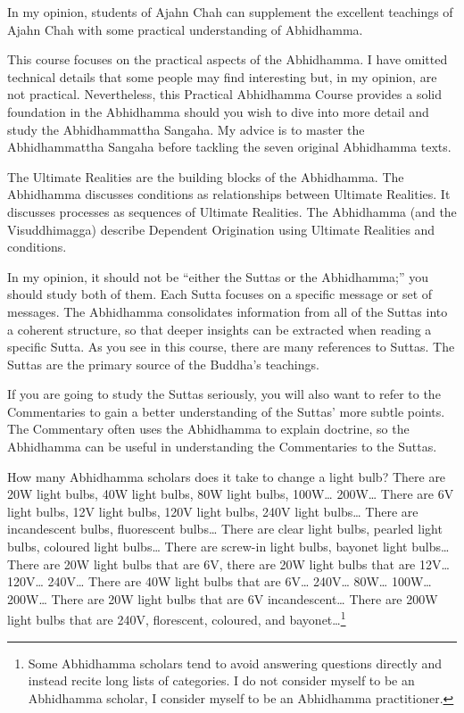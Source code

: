 In my opinion, students of Ajahn Chah can supplement the excellent teachings of Ajahn Chah with some practical understanding of Abhidhamma. 

This course focuses on the practical aspects of the Abhidhamma. I have omitted technical details that some people may find interesting but, in my opinion, are not practical. Nevertheless, this Practical Abhidhamma Course provides a solid foundation in the Abhidhamma should you wish to dive into more detail and study the Abhidhammattha Sangaha. My advice is to master the Abhidhammattha Sangaha before tackling the seven original Abhidhamma texts.


The Ultimate Realities are the building blocks of the Abhidhamma. The Abhidhamma discusses conditions as relationships between Ultimate Realities. It discusses processes as sequences of Ultimate Realities. The Abhidhamma (and the Visuddhimagga) describe Dependent Origination using Ultimate Realities and conditions.

\pagebreak


In my opinion, it should not be “either the Suttas or the Abhidhamma;” you should study both of them. Each Sutta focuses on a specific message or set of messages. The Abhidhamma consolidates information from all of the Suttas into a coherent structure, so that deeper insights can be extracted when reading a specific Sutta. As you see in this course, there are many references to Suttas. The Suttas are the primary source of the Buddha’s teachings.

If you are going to study the Suttas seriously, you will also want to refer to the Commentaries to gain a better understanding of the Suttas' more subtle points. The Commentary often uses the Abhidhamma to explain doctrine, so the Abhidhamma can be useful in understanding the Commentaries to the Suttas.


How many Abhidhamma scholars does it take to change a light bulb? There are 20W light bulbs, 40W light bulbs, 80W light bulbs, 100W… 200W… There are 6V light bulbs, 12V light bulbs, 120V light bulbs, 240V light bulbs… There are incandescent bulbs, fluorescent bulbs… There are clear light bulbs, pearled light bulbs, coloured light bulbs… There are screw-in light bulbs, bayonet light bulbs… There are 20W light bulbs that are 6V, there are 20W light bulbs that are 12V… 120V… 240V… There are 40W light bulbs that are 6V… 240V… 80W… 100W… 200W… There are 20W light bulbs that are 6V incandescent… There are 200W light bulbs that are 240V, florescent, coloured, and bayonet…\footnote{Some Abhidhamma scholars tend to avoid answering questions directly and instead recite long lists of categories. I do not consider myself to be an Abhidhamma scholar, I consider myself to be an Abhidhamma practitioner.}
